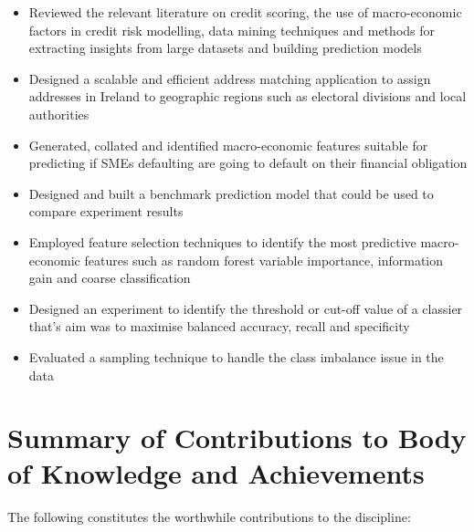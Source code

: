\begin{itemize}
	\item Reviewed the relevant literature on credit scoring, the use of macro-economic factors in credit risk modelling, data mining techniques and methods for extracting insights from large datasets and building prediction models
	\item Designed a scalable and efficient address matching application to assign addresses in Ireland to geographic regions such as electoral divisions and local authorities
	\item Generated, collated and identified macro-economic features suitable for predicting if SMEs defaulting are going to default on their financial obligation
	\item Designed and built a benchmark prediction model that could be used to compare experiment results
	\item Employed feature selection techniques to identify the most predictive macro-economic features such as random forest variable importance, information gain and coarse classification
	\item Designed an experiment to identify the threshold or cut-off value of a classier that's aim was to maximise balanced accuracy, recall and specificity 
	\item Evaluated a sampling technique to handle the class imbalance issue in the data
\end{itemize}





\section{Summary of Contributions to Body of Knowledge and Achievements}

The following constitutes the worthwhile contributions to the discipline:

